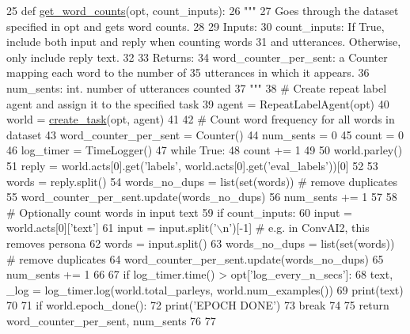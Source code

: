 \begin{DoxyCode}
25 \textcolor{keyword}{def }\hyperlink{namespaceprojects_1_1controllable__dialogue_1_1controllable__seq2seq_1_1nidf_ad06ddb173f03a586d8c47c0c40f2f00c}{get\_word\_counts}(opt, count\_inputs):
26     \textcolor{stringliteral}{"""}
27 \textcolor{stringliteral}{    Goes through the dataset specified in opt and gets word counts.}
28 \textcolor{stringliteral}{}
29 \textcolor{stringliteral}{    Inputs:}
30 \textcolor{stringliteral}{      count\_inputs: If True, include both input and reply when counting words}
31 \textcolor{stringliteral}{        and utterances. Otherwise, only include reply text.}
32 \textcolor{stringliteral}{}
33 \textcolor{stringliteral}{    Returns:}
34 \textcolor{stringliteral}{      word\_counter\_per\_sent: a Counter mapping each word to the number of}
35 \textcolor{stringliteral}{        utterances in which it appears.}
36 \textcolor{stringliteral}{      num\_sents: int. number of utterances counted}
37 \textcolor{stringliteral}{    """}
38     \textcolor{comment}{# Create repeat label agent and assign it to the specified task}
39     agent = RepeatLabelAgent(opt)
40     world = \hyperlink{namespaceparlai_1_1core_1_1worlds_a11923c10b545c7ecc1b08fe2242d9c2c}{create\_task}(opt, agent)
41 
42     \textcolor{comment}{# Count word frequency for all words in dataset}
43     word\_counter\_per\_sent = Counter()
44     num\_sents = 0
45     count = 0
46     log\_timer = TimeLogger()
47     \textcolor{keywordflow}{while} \textcolor{keyword}{True}:
48         count += 1
49 
50         world.parley()
51         reply = world.acts[0].get(\textcolor{stringliteral}{'labels'}, world.acts[0].get(\textcolor{stringliteral}{'eval\_labels'}))[0]
52 
53         words = reply.split()
54         words\_no\_dups = list(set(words))  \textcolor{comment}{# remove duplicates}
55         word\_counter\_per\_sent.update(words\_no\_dups)
56         num\_sents += 1
57 
58         \textcolor{comment}{# Optionally count words in input text}
59         \textcolor{keywordflow}{if} count\_inputs:
60             input = world.acts[0][\textcolor{stringliteral}{'text'}]
61             input = input.split(\textcolor{stringliteral}{'\(\backslash\)n'})[-1]  \textcolor{comment}{# e.g. in ConvAI2, this removes persona}
62             words = input.split()
63             words\_no\_dups = list(set(words))  \textcolor{comment}{# remove duplicates}
64             word\_counter\_per\_sent.update(words\_no\_dups)
65             num\_sents += 1
66 
67         \textcolor{keywordflow}{if} log\_timer.time() > opt[\textcolor{stringliteral}{'log\_every\_n\_secs'}]:
68             text, \_log = log\_timer.log(world.total\_parleys, world.num\_examples())
69             print(text)
70 
71         \textcolor{keywordflow}{if} world.epoch\_done():
72             print(\textcolor{stringliteral}{'EPOCH DONE'})
73             \textcolor{keywordflow}{break}
74 
75     \textcolor{keywordflow}{return} word\_counter\_per\_sent, num\_sents
76 
77 
\end{DoxyCode}
